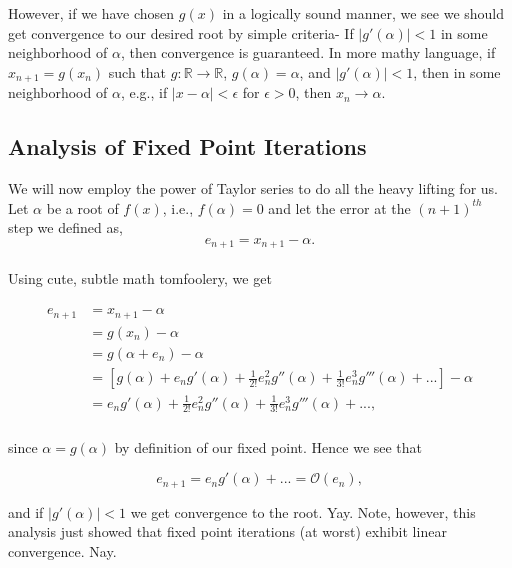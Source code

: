 \documentclass[paper=a4, fontsize=11pt]{scrartcl} %
\numberwithin{equation}{section} %
\numberwithin{figure}{section} %
\numberwithin{table}{section} %
\begin{document}
However, if we have chosen $g(x)$ in a logically sound manner, we see we should get convergence to our desired root by simple criteria- If $|g'(\alpha)|<1$ in some neighborhood of $\alpha$, then convergence is guaranteed. In more mathy language, if $x_{n+1} = g(x_n)$ such that $g:\mathbb{R}\rightarrow\mathbb{R}$, $g(\alpha)=\alpha$, and $|g'(\alpha)|<1$, then in some neighborhood of $\alpha$, e.g., if $|x-\alpha|<\epsilon$ for $\epsilon>0$, then $x_n\rightarrow\alpha$.\\

% 
%
\subsection{Analysis of Fixed Point Iterations}

$ $\\

We will now employ the power of Taylor series to do all the heavy lifting for us. Let $\alpha$ be a root of $f(x)$, i.e., $f(\alpha)=0$ and let the error at the $(n+1)^{th}$ step we defined as, $$e_{n+1} = x_{n+1} - \alpha.$$\\
Using cute, subtle math tomfoolery, we get

\begin{align} 
\nonumber
\begin{split}
e_{n+1}&= x_{n+1} - \alpha \\
&= g(x_n) - \alpha \\
&=g(\alpha + e_n)  - \alpha \\
&=\left[g(\alpha) + e_n g'(\alpha) + \frac{1}{2!} e_n^2 g''(\alpha) + \frac{1}{3!} e_n^3 g'''(\alpha) + ... \right] - \alpha \\
&= e_n g'(\alpha) + \frac{1}{2!} e_n^2 g''(\alpha) + \frac{1}{3!} e_n^3 g'''(\alpha) + ... , \\
\end{split}					
\end{align}

since $\alpha = g(\alpha)$ by definition of our fixed point. Hence we see that 

$$e_{n+1} = e_n g'(\alpha) + ... = \mathcal{O}(e_n),$$

and if $|g'(\alpha)|<1$ we get convergence to the root. Yay. Note, however, this analysis just showed that fixed point iterations (at worst) exhibit linear convergence. Nay. \\

%
%
\end{document}
